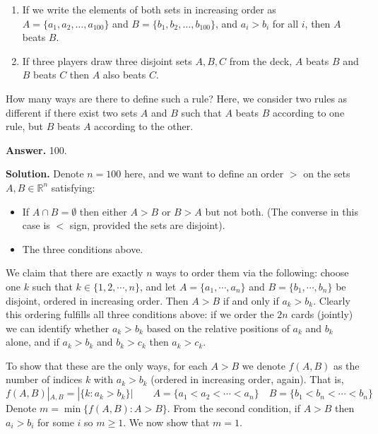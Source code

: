 \documentclass[11pt,a4paper]{article}
\begin{document}
\begin{enumerate}
\begin{enumerate}
		\item If we write the elements of both sets in increasing order as $A =\{ a_1 , a_2 , \ldots, a_{100} \}$ and $B= \{ b_1 , b_2 , \ldots , b_{100} \}$, and $a_i > b_i$ for all $i$, then $A$ beats $B$.
		\item If three players draw three disjoint sets $A, B, C$ from the deck, $A$ beats $B$ and $B$ beats $C$ then $A$ also beats $C$.
		
	\end{enumerate}
	How many ways are there to define such a rule? Here, we consider two rules as different if there exist two sets $A$ and $B$ such that $A$ beats $B$ according to one rule, but $B$ beats $A$ according to the other.
	
	\textbf{Answer.} 100. 
	
	\textbf{Solution.} Denote $n=100$ here, and we want to define an order $>$ on the sets $A, B\in \mathbb{R}^{n}$ satisfying: 
	\begin{itemize}
		\item If $A\cap B=\emptyset$ then either $A>B$ or $B>A$ but not both. (The converse in this case is $<$ sign, provided the sets are disjoint). 
		
		\item The three conditions above. 
	\end{itemize}
	We claim that there are exactly $n$ ways to order them via the following: choose one $k$ such that $k\in \{1, 2, \cdots , n\}$, and let $A=\{a_1, \cdots , a_n\}$ and $B=\{b_1, \cdots, b_n\}$ be disjoint, ordered in increasing order. Then $A>B$ if and only if $a_k>b_k$. Clearly this ordering fulfills all three conditions above: if we order the $2n$ cards (jointly) we can identify whether $a_k>b_k$ based on the relative positions of $a_k$ and $b_k$ alone, and if $a_k>b_k$ and $b_k>c_k$ then $a_k>c_k$. 
	
	To show that these are the only ways, for each $A>B$ we denote $f(A, B)$ as the number of indices $k$ with $a_k>b_k$ (ordered in increasing order, again). That is, 
	\[
	f(A, B)|_{A, B} = |\{k: a_k>b_k\}|\qquad A=\{a_1<a_2<\cdots <a_n\}\quad B=\{b_1<b_n<\cdots < b_n\}
	\]
	Denote $m=\min\{f(A, B): A>B\}$. From the second condition, if $A>B$ then $a_i>b_i$ for some $i$ so $m\ge 1$. We now show that $m=1$. 
	

\end{enumerate}
\end{document}
